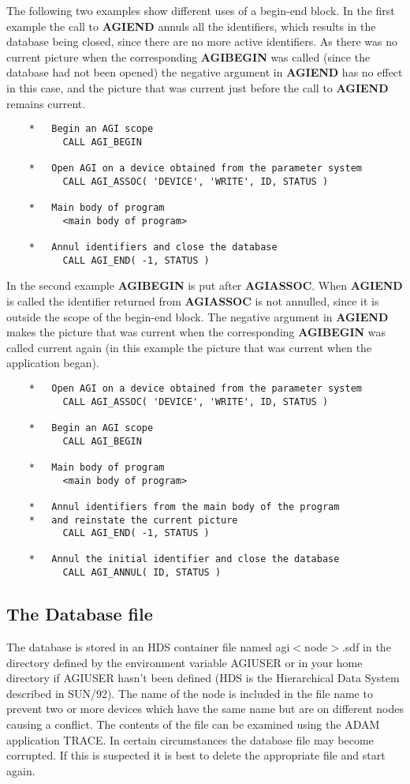 \documentclass[twoside,11pt]{article}
\newcommand{\htmlref}[2]{#1}
\newcommand{\xref}[3]{#1}
\renewcommand{\_}{\texttt{\symbol{95}}}
\begin{document}
The following two examples show different uses of a begin-end block.
In the first example the call to {\bf AGI\_END} annuls all the
identifiers, which results in the database being closed, since there
are no more active identifiers. As there was no current picture when
the corresponding {\bf AGI\_BEGIN} was called (since the database had
not been opened) the negative argument in {\bf AGI\_END} has no effect
in this case, and the picture that was current just before the call to
{\bf AGI\_END} remains current.
\begin{verbatim}
    *   Begin an AGI scope
          CALL AGI_BEGIN

    *   Open AGI on a device obtained from the parameter system
          CALL AGI_ASSOC( 'DEVICE', 'WRITE', ID, STATUS )

    *   Main body of program
          <main body of program>

    *   Annul identifiers and close the database
          CALL AGI_END( -1, STATUS )
\end{verbatim}
In the second example {\bf AGI\_BEGIN} is put after {\bf AGI\_ASSOC}.
When {\bf AGI\_END} is called the identifier returned from 
\htmlref{{\bf AGI\_ASSOC}}{AGI_ASSOC}
is not annulled, since it is outside the scope of the begin-end block.
The negative argument in {\bf AGI\_END} makes the picture that was current
when the corresponding {\bf AGI\_BEGIN} was called current again (in this
example the picture that was current when the application began).
\begin{verbatim}
    *   Open AGI on a device obtained from the parameter system
          CALL AGI_ASSOC( 'DEVICE', 'WRITE', ID, STATUS )

    *   Begin an AGI scope
          CALL AGI_BEGIN

    *   Main body of program
          <main body of program>

    *   Annul identifiers from the main body of the program
    *   and reinstate the current picture
          CALL AGI_END( -1, STATUS )

    *   Annul the initial identifier and close the database
          CALL AGI_ANNUL( ID, STATUS )
\end{verbatim}

\subsection{The Database file}

The database is stored in an HDS container file named agi\_$<$node$>$.sdf
in the directory defined by the environment variable AGI\_USER or in 
your home directory if AGI\_USER hasn't been defined
(HDS is the Hierarchical Data System described in \xref{SUN/92}{sun92}{}). 
The name of the
node is included in the file name to prevent two or more devices which
have the same name but are on different nodes causing a conflict.
The contents of the file can be examined using the ADAM application TRACE.
In certain circumstances the database file may become corrupted. If this
is suspected it is best to delete the appropriate file and start again.
\end{document}
